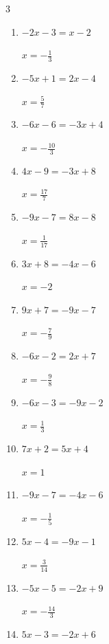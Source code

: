 \begin{multicols}{3}
\begin{enumerate}
        $\displaystyle x=3$

  \item $-2x-3=x-2$

        $\displaystyle x=-\frac{1}{3}$

  \item $-5x+1=2x-4$

        $\displaystyle x=\frac{5}{7}$

  \item $-6x-6=-3x+4$

        $\displaystyle x=-\frac{10}{3}$

  \item $4x-9=-3x+8$

        $\displaystyle x=\frac{17}{7}$

  \item $-9x-7=8x-8$

        $\displaystyle x=\frac{1}{17}$

\columnbreak %

\resetques

  \item $3x+8=-4x-6$

        $\displaystyle x=-2$

  \item $9x+7=-9x-7$

        $\displaystyle x=-\frac{7}{9}$

  \item $-6x-2=2x+7$

        $\displaystyle x=-\frac{9}{8}$

  \item $-6x-3=-9x-2$

        $\displaystyle x=\frac{1}{3}$

  \item $7x+2=5x+4$

        $\displaystyle x=1$

  \item $-9x-7=-4x-6$

        $\displaystyle x=-\frac{1}{5}$

  \item $5x-4=-9x-1$

        $\displaystyle x=\frac{3}{14}$

  \item $-5x-5=-2x+9$

        $\displaystyle x=-\frac{14}{3}$

  \item $5x-3=-2x+6$


\end{enumerate}
\end{multicols}
